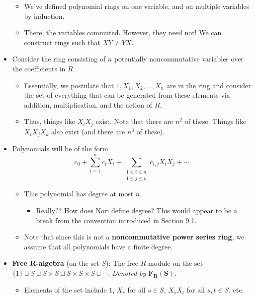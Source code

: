 \documentclass[../notes.tex]{subfiles}
\begin{document}
\begin{itemize}
    \begin{itemize}
        \item We've defined polynomial rings on one variable, and on multiple variables by induction.
        \item There, the variables commuted. However, they need not! We can construct rings such that $XY\neq YX$.
    \end{itemize}
    \item Consider the ring consisting of $n$ potentially noncommutative variables over the coefficients in $R$.
    \begin{itemize}
        \item Essentially, we postulate that $1,X_1,X_2,\dots,X_n$ are in the ring and consider the set of everything that can be generated from these elements via addition, multiplication, and the action of $R$.
        \item Thus, things like $X_iX_j$ exist. Note that there are $n^2$ of these. Things like $X_iX_jX_k$ also exist (and there are $n^3$ of these).
    \end{itemize}
    \item Polynomials will be of the form
    \begin{equation*}
        c_0+\sum_{i=1}^nc_iX_i+\sum_{\substack{1\leq i\leq n\\1\leq j\leq n}}c_{i,j}X_iX_j+\cdots
    \end{equation*}
    \begin{itemize}
        \item This polynomial has degree at most $n$.
        \begin{itemize}
            \item Really?? How does Nori define degree? This would appear to be a break from the convention introduced in Section 9.1.
        \end{itemize}
        \item Note that since this is not a \textbf{noncommutative power series ring}, we assume that all polynomials have a finite degree.
    \end{itemize}
    \item \textbf{Free $\bm{R}$-algebra} (on the set $S$): The free $R$-module on the set $\{1\}\sqcup S\sqcup S\times S\sqcup S\times S\times S\sqcup\cdots$. \emph{Denoted by} $\bm{F_R(S)}$.
    \begin{itemize}
        \item Elements of the set include $1$, $X_s$ for all $s\in S$, $X_sX_t$ for all $s,t\in S$, etc.

\end{itemize}
\end{itemize}
\end{document}
